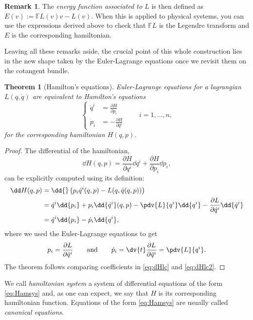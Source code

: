 \documentclass[english,fontsize=11pt,paper=b5]{scrbook}
\numberwithin{equation}{chapter}
\newtheorem{theorem}{Theorem}[chapter]
\theoremstyle{definition}
\newtheorem{remark}{Remark}[chapter]
\begin{document}
\begin{remark}
      The \emph{energy function associated to $L$} is then defined as $E(v) := \mathbb{F}L(v) v - L(v)$. When this is applied to physical systems, you can use the expressions derived above to check that $\mathbb{F}L$ is the Legendre transform and $E$ is the corresponding hamiltonian.
    \end{remark}

    Leaving all these remarks aside, the crucial point of this whole construction lies in the new shape taken by the Euler-Lagrange equations once we revisit them on the cotangent bundle.

    \begin{theorem}[Hamilton's equations]\label{thm:Hameqns}
      Euler-Lagrange equations for a lagrangian $L(q,\dot q)$ are equivalent to \emph{Hamilton's equations}
      \begin{equation}\label{eq:Hamsys}
        \left\lbrace
          \begin{aligned}
            \dot q^i & = \frac{\partial H}{\partial p_i}  \\
            \dot p_i & = -\frac{\partial H}{\partial q^i}
          \end{aligned}
        \right. \qquad i=1,\ldots,n,
      \end{equation}
      for the corresponding hamiltonian $H(q,p)$.
    \end{theorem}
    \begin{proof}
      The differential of the hamiltonian,
      \begin{equation}\label{eq:dHlc}
        \dd H(q,p) = \frac{\partial H}{\partial q^i}\dd q^i + \frac{\partial H}{\partial p_i}\dd p_i,
      \end{equation}
      can be explicitly computed using its definition:
      \begin{align}
        \dd H(q,p) & = \dd{}\left( p_i\dot{q}^i(q,p) - L(q, \dot{q}(q,p)) \right)                                                                             \\
                   & = \dot{q}^i \dd{p_i} + p_i \dd{\dot{q}^i}(q,p) - \pdv{L}{q^i} \dd{q^i} - \frac{\partial L}{\partial \dot{q}^i} \dd{\dot{q}^i} \\
                   & = \dot{q}^i \dd{p_i} - \dot{p}_i \dd{q^i}, \label{eq:dHlc2}
      \end{align}
      where we used the Euler-Lagrange equations to get
      \begin{equation}
        p_i = \frac{\partial L}{\partial \dot{q}^i}
        \qquad\mbox{and}\qquad
        \dot p_i = \dv{t}\frac{\partial L}{\partial \dot{q}^i} = \pdv{L}{q^i}.
      \end{equation}
      The theorem follows comparing coefficients in \eqref{eq:dHlc} and \eqref{eq:dHlc2}.
    \end{proof}
    We call \emph{hamiltonian system} a system of differential equations of the form \eqref{eq:Hamsys} and, as one can expect, we say that $H$ is its corresponding hamiltonian function. Equations of the form \eqref{eq:Hamsys} are usually called \emph{canonical equations}.
\end{document}
